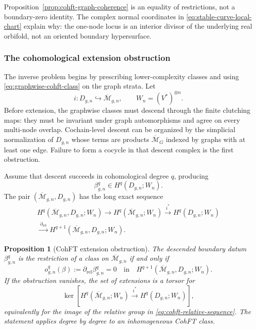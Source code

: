 \documentclass[11pt,letterpaper,twoside]{article}
\theoremstyle{plain}
\newtheorem{proposition}[theorem]{Proposition}
\theoremstyle{definition}
\theoremstyle{remark}
\begin{document}
Proposition~\ref{prop:cohft-graph-coherence} is an equality of restrictions, not a boundary-zero identity.  The complex normal coordinates in \eqref{eq:stable-curve-local-chart} explain why: the one-node locus is an interior divisor of the underlying real orbifold, not an oriented boundary hypersurface.

\subsubsection{The cohomological extension obstruction}

The inverse problem begins by prescribing lower-complexity classes and using \eqref{eq:graphwise-cohft-class} on the graph strata.  Let
\[
 i:D_{g,n}\hookrightarrow\overline{\mathcal M}_{g,n},
 \qquad
 W_n=(V^*)^{\otimes n}.
\]
Before extension, the graphwise classes must descend through the finite clutching maps: they must be invariant under graph automorphisms and agree on every multi-node overlap.  Cochain-level descent can be organized by the simplicial normalization of \(D_{g,n}\) whose terms are products \(\overline{\mathcal M}_G\) indexed by graphs with at least one edge.  Failure to form a cocycle in that descent complex is the first obstruction.

Assume that descent succeeds in cohomological degree \(q\), producing
\[
 \beta_{g,n}^q\in H^q(D_{g,n};W_n).
\]
The pair \((\overline{\mathcal M}_{g,n},D_{g,n})\) has the long exact sequence
\begin{multline}\label{eq:cohft-relative-sequence}
 H^q(\overline{\mathcal M}_{g,n},D_{g,n};W_n)
 \longrightarrow
 H^q(\overline{\mathcal M}_{g,n};W_n)
 \xrightarrow{i^*}
 H^q(D_{g,n};W_n)
 \\
 \xrightarrow{\ \partial_{\mathrm{rel}}\ }
 H^{q+1}(\overline{\mathcal M}_{g,n},D_{g,n};W_n).
\end{multline}

\begin{proposition}[CohFT extension obstruction]\label{prop:cohft-extension-obstruction}
The descended boundary datum \(\beta_{g,n}^q\) is the restriction of a class on \(\overline{\mathcal M}_{g,n}\) if and only if
\begin{equation}\label{eq:cohft-extension-class}
 o_{g,n}^q(\beta)
 :=
 \partial_{\mathrm{rel}}\beta_{g,n}^q
 =0
 \quad\text{in}\quad
 H^{q+1}(\overline{\mathcal M}_{g,n},D_{g,n};W_n).
\end{equation}
If the obstruction vanishes, the set of extensions is a torsor for
\begin{equation}\label{eq:cohft-extension-torsor}
 \ker\!\left[
 H^q(\overline{\mathcal M}_{g,n};W_n)
 \xrightarrow{i^*}H^q(D_{g,n};W_n)
 \right],
\end{equation}
equivalently for the image of the relative group in \eqref{eq:cohft-relative-sequence}.  The statement applies degree by degree to an inhomogeneous CohFT class.
\end{proposition}
\end{document}
